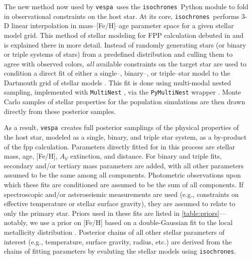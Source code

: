 \documentclass{emulateapj}
\newcommand{\vespa}{\texttt{vespa}}
\newcommand{\isochrones}{\texttt{isochrones}}
\begin{document}
The new method now used by \vespa\ uses the \isochrones\ Python module
\citep{isochrones} to fold in observational constraints on the host
star.  At its core, \isochrones\ performs 3-D linear interpolation in
mass--[Fe/H]--age parameter space for a given stellar model grid.
This method of stellar modeling for FPP calculation debuted in
\citet{Montet:2015} and is explained there in more detail.  Instead of
randomly generating stars (or binary or triple systems of stars) from
a predefined distribution and culling them to agree with observed
colors, \emph{all} available constraints on the target star are used
to condition a direct fit of either a single--, binary--, or
triple--star model to the Dartmouth grid of stellar models
\citep{Dotter:2008, Feiden:2011}.  This fit is done using multi-modal
nested sampling, implemented with \texttt{MultiNest}
\citep{Feroz:2009, Feroz:2011, Feroz:2013}, via the
\texttt{PyMultiNest} wrapper \citep{Buchner:2014}.  Monte Carlo
samples of stellar properties for the population simulations are then
drawn directly from these posterior samples.

As a result, \vespa\ creates full posterior samplings of the physical
properties of the host star, modeled as a single, binary, and triple
star system, as a by-product of the \ac{fpp} calculation.  Parameters
directly fitted for in this process are stellar mass, age, [Fe/H],
$A_V$ extinction, and distance.  For binary and triple fits, secondary
and/or tertiary mass parameters are added, with all other parameters
assumed to be the same among all components.  Photometric observations
upon which these fits are conditioned are assumed to be the sum of all
components.  If spectroscopic and/or asteroseismic measurements are
used (e.g., constraints on effective temperature or stellar surface
gravity), they are assumed to relate to only the primary star.  Priors
used in these fits are listed in \autoref{table:priors}---notably, we
use a prior on [Fe/H] based on a double-Gaussian fit to the local
metallicity distribution \citep{Hayden:2015, Casagrande:2011}.  Posterior
chains of all other stellar parameters of interest (e.g., temperature,
surface gravity, radius, etc.) are derived from the chains of fitting
parameters by evaluting the stellar models using \isochrones.
\end{document}
